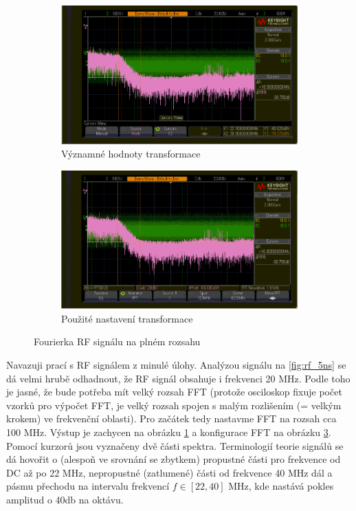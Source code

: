\documentclass[twoside]{article}
\begin{document}
\begin{figure}[htbp]
	\centering
	\begin{subfigure}{0.45\textwidth}
		\includegraphics[width=\linewidth]{rf_fft_amplitudy.png         }
		\caption{Významné hodnoty transformace}
		\label{fig:fft_rf}
		\end{subfigure}
	\begin{subfigure}{0.45\textwidth}
		\includegraphics[width=\linewidth]{rf_fft_resolution.png                    }
		\caption{Použité nastavení transformace}
		\label{fig:fft_rf_config}
	\end{subfigure}
	\caption{Fourierka RF signálu na plném rozsahu}
\end{figure}

Navazuji prací s RF signálem z minulé úlohy. Analýzou signálu na \ref{fig:rf_5ns} se dá velmi hrubě odhadnout, že RF signál obsahuje i frekvenci 20 MHz.
Podle toho je jasné, že bude potřeba mít velký rozsah FFT (protože osciloskop fixuje počet vzorků pro výpočet FFT, je velký rozsah spojen s malým rozlišením (= velkým krokem)
ve frekvenční oblasti). Pro začátek tedy nastavme FFT na rozsah cca 100 MHz. Výstup je zachycen na obrázku \ref{fig:fft_rf} a konfigurace FFT na obrázku \ref{fig:fft_rf_config}.
Pomocí kurzorů jsou vyznačeny dvě části spektra.
Terminologií teorie signálů se dá hovořit o (alespoň ve srovnání se zbytkem) propustné části pro frekvence od DC až po 22 MHz,
nepropustné (zatlumené) části od frekvence 40 MHz dál a pásmu přechodu na intervalu frekvencí $f \in \left[ 22, 40 \right]$ MHz, kde nastává pokles amplitud o 40db na oktávu.
\end{document}
